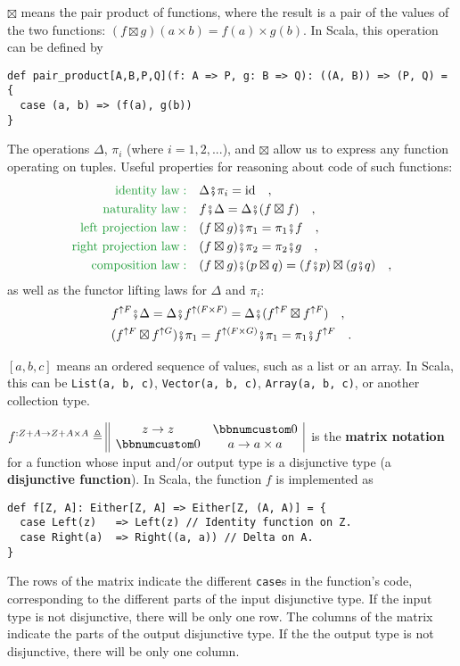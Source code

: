 $\boxtimes$ means the pair product
of functions, where the result is a pair of the values of the two
functions: $(f\boxtimes g)(a\times b)=f(a)\times g(b)$. In Scala,
this operation can be defined by
\begin{lstlisting}
def pair_product[A,B,P,Q](f: A => P, g: B => Q): ((A, B)) => (P, Q) = {
  case (a, b) => (f(a), g(b))
}
\end{lstlisting}
The operations $\Delta$, $\pi_{i}$ (where $i=1,2,...$), and $\boxtimes$
allow us to express any function operating on tuples. Useful properties
for reasoning about code of such functions: 
\begin{align*}
{\color{greenunder}\text{identity law}:}\quad & \Delta\bef\pi_{i}=\text{id}\quad,\\
{\color{greenunder}\text{naturality law}:}\quad & f\bef\Delta=\Delta\bef(f\boxtimes f)\quad,\\
{\color{greenunder}\text{left projection law}:}\quad & (f\boxtimes g)\bef\pi_{1}=\pi_{1}\bef f\quad,\\
{\color{greenunder}\text{right projection law}:}\quad & (f\boxtimes g)\bef\pi_{2}=\pi_{2}\bef g\quad,\\
{\color{greenunder}\text{composition law}:}\quad & (f\boxtimes g)\bef(p\boxtimes q)=(f\bef p)\boxtimes(g\bef q)\quad,
\end{align*}
as well as the functor lifting laws for $\Delta$ and $\pi_{i}$:
\begin{align*}
 & f^{\uparrow F}\bef\Delta=\Delta\bef f^{\uparrow(F\times F)}=\Delta\bef(f^{\uparrow F}\boxtimes f^{\uparrow F})\quad,\\
 & (f^{\uparrow F}\boxtimes f^{\uparrow G})\bef\pi_{1}=f^{\uparrow(F\times G)}\bef\pi_{1}=\pi_{1}\bef f^{\uparrow F}\quad.
\end{align*}

$\left[a,b,c\right]$ means an ordered sequence of values, such as
a list or an array. In Scala, this can be \lstinline!List(a, b, c)!,
\lstinline!Vector(a, b, c)!, \lstinline!Array(a, b, c)!, or another
collection type.

$f^{:Z+A\rightarrow Z+A\times A}\triangleq\begin{array}{||cc|}
z\rightarrow z & \bbnum 0\\
\bbnum 0 & a\rightarrow a\times a
\end{array}\,$ is the \textbf{matrix notation} for a function
whose input and/or output type is a disjunctive type (a
\textbf{disjunctive function}). In Scala, the function $f$ is implemented
as
\begin{lstlisting}
def f[Z, A]: Either[Z, A] => Either[Z, (A, A)] = {
  case Left(z)   => Left(z) // Identity function on Z.
  case Right(a)  => Right((a, a)) // Delta on A.
}
\end{lstlisting}
The rows of the matrix indicate the different \lstinline!case!s in
the function\textsf{'}s code, corresponding to the different parts of the input
disjunctive type. If the input type is not disjunctive, there will
be only one row. The columns of the matrix indicate the parts of the
output disjunctive type. If the the output type is not disjunctive,
there will be only one column.

